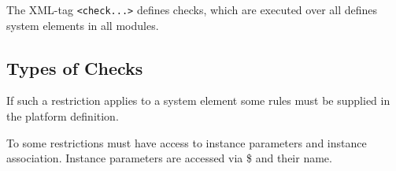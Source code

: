 The XML-tag \verb|<check...>| defines checks, which are executed
over all defines system elements in all modules.

\subsection{Types of Checks}

If such a restriction applies  to a system element some rules must be supplied 
in the platform definition.

To some restrictions must have access to instance parameters and instance association.
Instance parameters are accessed via \$ and their name.

